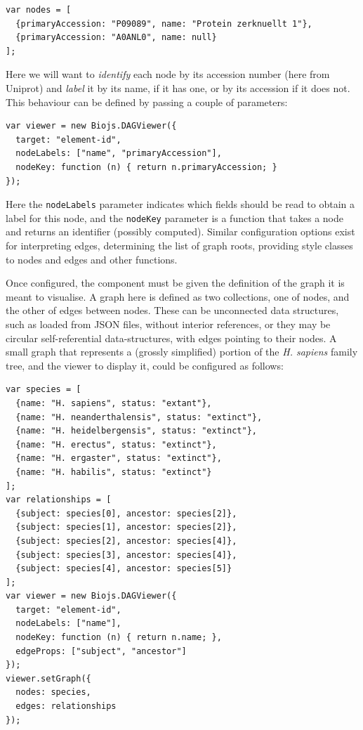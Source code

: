 \documentclass[10pt,a4paper,twocolumn]{article}
\begin{document}
\begin{lstlisting}[caption={Example Nodes}, label={code:example-nodes}]
var nodes = [
  {primaryAccession: "P09089", name: "Protein zerknuellt 1"},
  {primaryAccession: "A0ANL0", name: null}
];
\end{lstlisting}

Here we will want to \textit{identify} each node by its accession number (here
from Uniprot) and \textit{label} it by its name, if it has one, or by its
accession if it does not. This behaviour can be defined by passing a couple of
parameters:

\begin{lstlisting}[caption={Node Adaptor Example}, label={code:node-adaptor}]
var viewer = new Biojs.DAGViewer({
  target: "element-id",
  nodeLabels: ["name", "primaryAccession"],
  nodeKey: function (n) { return n.primaryAccession; }
});
\end{lstlisting}

Here the \texttt{nodeLabels} parameter indicates which fields should be read to
obtain a label for this node, and the \texttt{nodeKey} parameter is a function
that takes a node and returns an identifier (possibly computed). Similar
configuration options exist for interpreting edges, determining the list of
graph roots, providing style classes to nodes and edges and other functions.

Once configured, the component must be given the definition of the graph it is
meant to visualise. A graph here is defined as two collections, one of nodes,
and the other of edges between nodes. These can be unconnected data structures,
such as loaded from JSON files, without interior references, or they may be
circular self-referential data-structures, with edges pointing to their nodes. A
small graph that represents a (grossly simplified) portion of the \textit{H.
sapiens} family tree, and the viewer to display it, could be configured as
follows:

\begin{lstlisting}[caption={\emph{H. sapiens} phylogenetic tree sample graph}]
var species = [
  {name: "H. sapiens", status: "extant"},
  {name: "H. neanderthalensis", status: "extinct"},
  {name: "H. heidelbergensis", status: "extinct"},
  {name: "H. erectus", status: "extinct"},
  {name: "H. ergaster", status: "extinct"},
  {name: "H. habilis", status: "extinct"}
];
var relationships = [
  {subject: species[0], ancestor: species[2]},
  {subject: species[1], ancestor: species[2]},
  {subject: species[2], ancestor: species[4]},
  {subject: species[3], ancestor: species[4]},
  {subject: species[4], ancestor: species[5]}
];
var viewer = new Biojs.DAGViewer({
  target: "element-id",
  nodeLabels: ["name"],
  nodeKey: function (n) { return n.name; },
  edgeProps: ["subject", "ancestor"]
});
viewer.setGraph({
  nodes: species,
  edges: relationships
});
\end{lstlisting}
\end{document}
